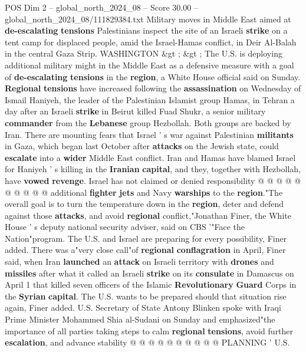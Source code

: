\begin{textsample}{POS Dim 2 – global\_north\_2024\_08 – Score 30.00 – global\_north\_2024\_08/111829384.txt}  \label{ex:f2_pos_084}
Military moves in Middle East aimed at \textbf{de-escalating} \textbf{tensions} Palestinians inspect the site of an Israeli \textbf{strike} on a tent camp for displaced people, amid the Israel-Hamas conflict, in Deir Al-Balah in the central Gaza Strip.
WASHINGTON \&gt ; \&gt ; The U.S. is deploying additional military might in the Middle East as a defensive measure with a goal of \textbf{de-escalating} \textbf{tensions} in the \textbf{region}, a White House official said on Sunday. \textbf{Regional} \textbf{tensions} have increased following the \textbf{assassination} on Wednesday of Ismail Haniyeh, the leader of the Palestinian Islamist group Hamas, in Tehran a day after an Israeli \textbf{strike} in Beirut killed Fuad Shukr, a senior military \textbf{commander} from the \textbf{Lebanese} group Hezbollah.
Both groups are backed by Iran.
There are mounting fears that Israel ' s war against Palestinian \textbf{militants} in Gaza, which began last October after \textbf{attacks} on the Jewish state, could \textbf{escalate} into a \textbf{wider} Middle East conflict.
Iran and Hamas have blamed Israel for Haniyeh ' s killing in the \textbf{Iranian} \textbf{capital}, and they, together with Hezbollah, have \textbf{vowed} \textbf{revenge}.
Israel has not claimed or denied responsibility @ @ @ @ @ @ @ @ @ @ additional \textbf{fighter} \textbf{jets} and Navy \textbf{warships} to the \textbf{region}."The overall goal is to turn the temperature down in the \textbf{region}, deter and defend against those \textbf{attacks}, and avoid \textbf{regional} conflict,"Jonathan Finer, the White House ' s deputy national security adviser, said on CBS '"Face the Nation"program.
The U.S. and Israel are preparing for every possibility, Finer added.
There was a"very close call"of \textbf{regional} \textbf{conflagration} in April, Finer said, when Iran \textbf{launched} an \textbf{attack} on Israeli territory with \textbf{drones} and \textbf{missiles} after what it called an Israeli \textbf{strike} on its \textbf{consulate} in Damascus on April 1 that killed seven officers of the Islamic \textbf{Revolutionary} \textbf{Guard} Corps in the \textbf{Syrian} \textbf{capital}.
The U.S. wants to be prepared should that situation rise again, Finer added.
U.S.
Secretary of State Antony Blinken spoke with Iraqi Prime Minister Mohammed Shia al-Sudani on Sunday and emphasized"the importance of all parties taking steps to calm \textbf{regional} \textbf{tensions}, avoid further \textbf{escalation}, and advance stability @ @ @ @ @ @ @ @ @ @ PLANNING ' U.S.

\end{textsample}
